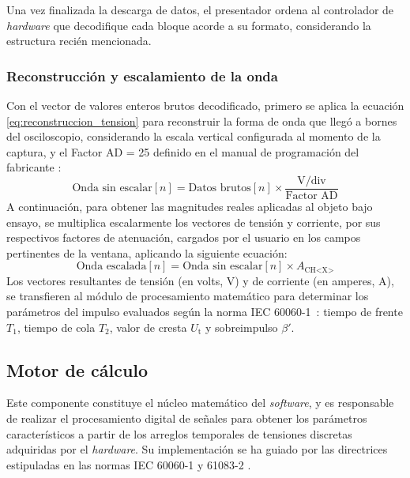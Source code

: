 Una vez finalizada la descarga de datos, el presentador ordena al controlador de \emph{hardware} que decodifique cada bloque acorde a su formato, considerando la estructura recién mencionada.

\subsubsection{Reconstrucción y escalamiento de la onda}

Con el vector de valores enteros brutos decodificado, primero se aplica la ecuación \eqref{eq:reconstruccion_tension} para reconstruir la forma de onda que llegó a bornes del osciloscopio, considerando la escala vertical configurada al momento de la captura, y el Factor AD = \num{25} definido en el manual de programación del fabricante \cite{gds1000au_ProgrammingManual}:
\begin{equation}
    \text{Onda sin escalar}[n] = \text{Datos brutos}[n] \times \frac{{\text
    {V/div}}}{\text{Factor AD}}
    \label{eq:reconstruccion_tension}
\end{equation}
A continuación, para obtener las magnitudes reales aplicadas al objeto bajo ensayo, se multiplica escalarmente los vectores de tensión y corriente, por sus respectivos factores de atenuación, cargados por el usuario en los campos pertinentes de la ventana, aplicando la siguiente ecuación:
\begin{equation}
    {\text{Onda escalada}}[n] = \text{Onda sin escalar}[n] \times A_{\text{CH<X>}}
    \label{eq:reconstruccion_tension_total}
\end{equation}
Los vectores resultantes de tensión (en volts, \unit{\volt}) y de corriente (en amperes, \unit{\ampere}), se transfieren al módulo de procesamiento matemático para determinar los parámetros del impulso evaluados según la norma IEC 60060-1~\cite{iec60060_1}: tiempo de frente $T_1$, tiempo de cola $T_2$, valor de cresta $U_{\text{t}}$ y sobreimpulso $\beta'$.

\subsection{Motor de cálculo}
\label{subsec:motor_calculo}

Este componente constituye el núcleo matemático del \emph{software}, y es responsable de realizar el procesamiento digital de señales para obtener los parámetros característicos a partir de los arreglos temporales de tensiones discretas adquiridas por el \emph{hardware}. Su implementación se ha guiado por las directrices estipuladas en las normas IEC 60060-1 \cite{iec60060_1} y 61083-2 \cite{iec61083_2}.

